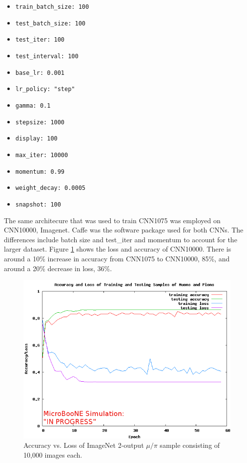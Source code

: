 \begin{itemize}
 \item \verb|train_batch_size: 100|
 \item \verb|test_batch_size: 100|
 \item \verb|test_iter: 100|
 \item \verb|test_interval: 100|
 \item \verb|base_lr: 0.001|
 \item \verb|lr_policy: "step"|
 \item \verb|gamma: 0.1|
 \item \verb|stepsize: 1000|
 \item \verb|display: 100|
 \item \verb|max_iter: 10000|
 \item \verb|momentum: 0.99|
 \item \verb|weight_decay: 0.0005|
 \item \verb|snapshot: 100|
\end{itemize}

The same architecure that was used to train CNN1075 was employed on CNN10000, Imagenet. Caffe \cite{caffe} was the software package used for both CNNs. The differences include batch size and test{\_}iter and momentum to account for the larger dataset. Figure \ref{fig:loss_accuracy} shows the loss and accuracy of CNN10000. There is around a 10\% increase in accuracy from CNN1075 to CNN10000, 85\%, and around a 20\% decrease in loss, 36\%.
\begin{figure}[htp!]
\centering
\includegraphics[scale=.4]{figs/acc_loss_10000_062117.png}
\caption{Accuracy vs. Loss of ImageNet 2-output $\mu/\pi$ sample consisting of 10,000 images each.} 
\label{fig:loss_accuracy}
\end{figure}

